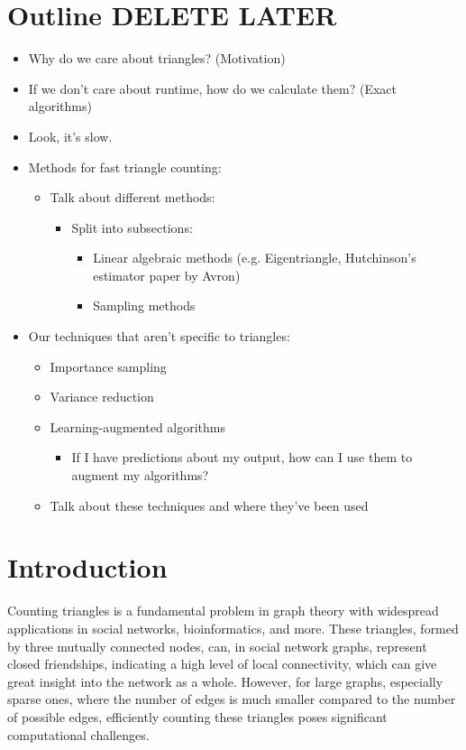 \documentclass[12pt]{report}
\begin{document}
\section{Outline DELETE LATER}
\begin{itemize}
    \item Why do we care about triangles? (Motivation)
    \item If we don't care about runtime, how do we calculate them? (Exact algorithms)
    \item Look, it's slow.
    \item Methods for fast triangle counting:
    \begin{itemize}
        \item Talk about different methods:
        \begin{itemize}
            \item Split into subsections:
            \begin{itemize}
                \item Linear algebraic methods (e.g. Eigentriangle, Hutchinson's estimator paper by Avron)
                \item Sampling methods
            \end{itemize}
        \end{itemize}
    \end{itemize}
    \item Our techniques that aren't specific to triangles:
    \begin{itemize}
        \item Importance sampling
        \item Variance reduction
        \item Learning-augmented algorithms
        \begin{itemize}
            \item If I have predictions about my output, how can I use them to augment my algorithms?
        \end{itemize}
        \item Talk about these techniques and where they've been used
    \end{itemize}
\end{itemize}

\section{Introduction}

Counting triangles is a fundamental problem in graph theory with widespread applications in social networks, bioinformatics, and more.
These triangles, formed by three mutually connected nodes, can, in social network graphs, represent closed friendships, indicating a high level of local connectivity, which can give great insight into the network as a whole.
However, for large graphs, especially sparse ones, where the number of edges is much smaller compared to the number of possible edges, efficiently counting these triangles poses significant computational challenges.
\end{document}
